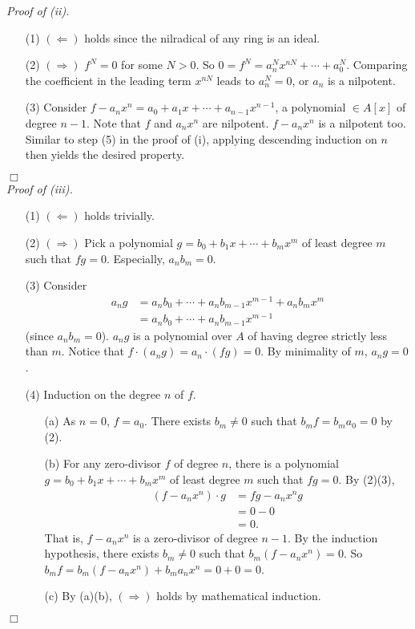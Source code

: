 \documentclass{article}
\begin{document}
\emph{Proof of (ii).}
\begin{enumerate}
\item[(1)]
$(\Longleftarrow)$ holds since the nilradical of any ring is an ideal.
\item[(2)]
$(\Longrightarrow)$ $f^N = 0$ for some $N > 0$.
So $0 = f^N = a_n^N x^{nN} + \cdots + a_0^N$.
Comparing the coefficient in the leading term $x^{nN}$ leads to $a_n^N = 0$,
or $a_n$ is a nilpotent.
\item[(3)]
Consider $f - a_n x^n = a_0 + a_1 x + \cdots + a_{n-1} x^{n-1}$,
a polynomial $\in A[x]$ of degree $n-1$.
Note that $f$ and $a_n x^n$ are nilpotent.
$f - a_n x^n$ is a nilpotent too.
Similar to step (5) in the proof of (i),
applying descending induction on $n$ then yields the desired property.
\end{enumerate}
$\Box$ \\

\emph{Proof of (iii).}
\begin{enumerate}
\item[(1)]
$(\Longleftarrow)$ holds trivially.
\item[(2)]
$(\Longrightarrow)$
Pick a polynomial $g = b_0 + b_1 x + \cdots + b_m x^m$
of least degree $m$ such that $fg = 0$.
Especially, $a_n b_m = 0$.
\item[(3)]
Consider
\begin{align*}
a_n g
&= a_n b_0 + \cdots + a_n b_{m-1} x^{m-1} + a_n b_m x^m \\
&= a_n b_0 + \cdots + a_n b_{m-1} x^{m-1}
\end{align*}
(since $a_n b_m = 0$).
$a_n g$ is a polynomial over $A$ of having degree strictly less than $m$.
Notice that $f \cdot (a_n g) = a_n \cdot (fg)= 0$.
By minimality of $m$, $a_n g = 0$.
\item[(4)]
Induction on the degree $n$ of $f$.
\begin{enumerate}
\item[(a)]
As $n = 0$, $f = a_0$. There exists $b_m \neq 0$ such that $b_m f = b_m a_0 = 0$ by (2).
\item[(b)]
For any zero-divisor $f$ of degree $n$,
there is a polynomial $g = b_0 + b_1 x + \cdots + b_m x^m$
of least degree $m$ such that $fg = 0$. By (2)(3),
\begin{align*}
(f - a_n x^n) \cdot g
&= fg - a_n x^n g \\
&= 0 - 0 \\
&= 0.
\end{align*}
That is, $f - a_n x^n$ is a zero-divisor of degree $n-1$.
By the induction hypothesis,
there exists $b_m \neq 0$ such that $b_{m}(f - a_n x^n) = 0$.
So $b_m f = b_{m}(f - a_n x^n) + b_m a_n x^n = 0 + 0 = 0$.
\item[(c)]
By (a)(b), $(\Longrightarrow)$ holds by mathematical induction.
\end{enumerate}
\end{enumerate}
$\Box$ \\
\end{document}
